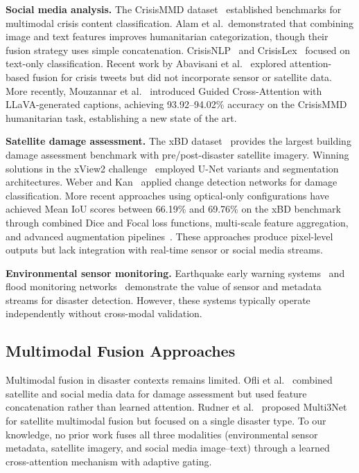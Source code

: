 \documentclass[journal]{IEEEtran}
\begin{document}
\textbf{Social media analysis.} The CrisisMMD dataset~\cite{alam2018crisismmd} established benchmarks for multimodal crisis content classification. Alam et al.\ demonstrated that combining image and text features improves humanitarian categorization, though their fusion strategy uses simple concatenation. CrisisNLP~\cite{imran2015processing} and CrisisLex~\cite{olteanu2015crisislex} focused on text-only classification. Recent work by Abavisani et al.~\cite{abavisani2020multimodal} explored attention-based fusion for crisis tweets but did not incorporate sensor or satellite data. More recently, Mouzannar et al.~\cite{mouzannar2025guidedcross} introduced Guided Cross-Attention with LLaVA-generated captions, achieving 93.92--94.02\% accuracy on the CrisisMMD humanitarian task, establishing a new state of the art.

\textbf{Satellite damage assessment.} The xBD dataset~\cite{gupta2019xbd} provides the largest building damage assessment benchmark with pre/post-disaster satellite imagery. Winning solutions in the xView2 challenge~\cite{xview2} employed U-Net variants and segmentation architectures. Weber and Kan~\cite{weber2020building} applied change detection networks for damage classification. More recent approaches using optical-only configurations have achieved Mean IoU scores between 66.19\% and 69.76\% on the xBD benchmark through combined Dice and Focal loss functions, multi-scale feature aggregation, and advanced augmentation pipelines~\cite{benson2025xbdsota}. These approaches produce pixel-level outputs but lack integration with real-time sensor or social media streams.

\textbf{Environmental sensor monitoring.} Earthquake early warning systems~\cite{allen2009real} and flood monitoring networks~\cite{basha2008model} demonstrate the value of sensor and metadata streams for disaster detection. However, these systems typically operate independently without cross-modal validation.

\subsection{Multimodal Fusion Approaches}

Multimodal fusion in disaster contexts remains limited. Ofli et al.~\cite{ofli2020analysis} combined satellite and social media data for damage assessment but used feature concatenation rather than learned attention. Rudner et al.~\cite{rudner2019multi3net} proposed Multi3Net for satellite multimodal fusion but focused on a single disaster type. To our knowledge, no prior work fuses all three modalities (environmental sensor metadata, satellite imagery, and social media image--text) through a learned cross-attention mechanism with adaptive gating.
\end{document}
